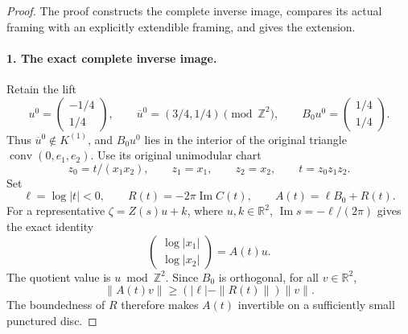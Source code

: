 
\begin{proof}
The proof constructs the complete inverse image, compares its actual
framing with an explicitly extendible framing, and gives the extension.

\paragraph{1. The exact complete inverse image.}
Retain the lift
\[
 u^0=\begin{pmatrix}-1/4\\1/4\end{pmatrix},\qquad
 \overline u^0=(3/4,1/4)\pmod{\mathbb Z^2},\qquad
 B_0u^0=\begin{pmatrix}1/4\\1/4\end{pmatrix}.
\]
Thus \(\overline u^0\notin K^{(1)}\), and \(B_0u^0\) lies in the
interior of the original triangle \(\operatorname{conv}(0,e_1,e_2)\).
Use its original unimodular chart
\begin{equation}
 z_0=t/(x_1x_2),\qquad z_1=x_1,\qquad z_2=x_2,
 \qquad t=z_0z_1z_2.
 \label{h24:gzero:eq:chart}
\end{equation}
Set
\[
 \ell=\log|t|<0,\qquad R(t)=-2\pi\operatorname{Im}C(t),\qquad
 A(t)=\ell B_0+R(t).
\]
For a representative \(\zeta=Z(s)u+k\), where \(u,k\in\mathbb R^2\),
\(\operatorname{Im}s=-\ell/(2\pi)\) gives the exact identity
\begin{equation}
 \begin{pmatrix}\log|x_1|\\\log|x_2|\end{pmatrix}
 =A(t)u.
 \label{h24:gzero:eq:moduli}
\end{equation}
The quotient value is \(u\bmod\mathbb Z^2\).
Since \(B_0\) is orthogonal, for all \(v\in\mathbb R^2\),
\begin{equation}
 \|A(t)v\|\geq (|\ell|-\|R(t)\|)\|v\|.
 \label{h24:gzero:eq:invertibility}
\end{equation}
The boundedness of \(R\) therefore makes \(A(t)\) invertible on a
sufficiently small punctured disc.


\end{proof}
